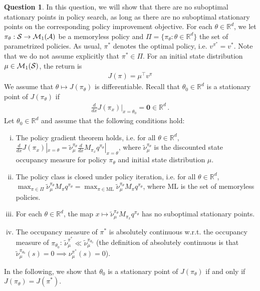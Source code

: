 \documentclass{article}
\newcommand{\R}{\mathbb{R}}
\DeclareMathOperator*{\1}{\mathbbm{1}}
\theoremstyle{definition}
\newtheorem{question}{Question}
\theoremstyle{remark}
\newcommand{\cS}{\mathcal{S}}
\newcommand{\cA}{\mathcal{A}}
\begin{document}
\begin{question} In this question, we will show that there are no suboptimal stationary points in policy search, as long as there are no suboptimal stationary points on the corresponding policy improvement objective. For each $\theta \in \R^d$, we let $\pi_\theta : \cS \rightarrow \cM_1(\cA)$ be a memoryless policy and $\Pi = \{\pi_\theta: \theta \in \R^d\}$ the set of parametrized policies. As usual, $\pi^*$ denotes the optimal policy, i.e. $v^{\pi^*} = v^*$. Note that we do not assume explicitly that $\pi^* \in \Pi$. For an initial state distribution $\mu \in \cM_1(\cS)$, the return is
\begin{align}
	J(\pi) = \mu^\top v^\pi
\end{align}
We assume that $\theta \mapsto J(\pi_\theta)$ is differentiable. Recall that $\theta_0 \in \R^d$ is a stationary point of $J(\pi_\theta)$ if
\begin{align}
\frac{d}{dx} J(\pi_x)|_{x = \theta_0}	= \mathbf{0} \in \R^d\,.
\end{align}
Let $\theta_0 \in \R^d$ and assume that the following conditions hold:
\begin{enumerate}[i)]
	\item The policy gradient theorem holds, i.e. for all $\theta \in \R^d$, $\frac{d}{dx} J(\pi_x)|_{x=\theta} = \tilde{\nu}^{\pi_\theta}_\mu \frac{d}{dx} M_{\pi_x} q^{\pi_\theta} |_{x=\theta}$, where  $\tilde{\nu}^{\pi_\theta}_\mu$ is the discounted state occupancy measure for policy $\pi_{\theta}$ and initial state distribution $\mu$.
	\item The policy class is closed under policy iteration, i.e. for all $\theta \in \R^d$, $\max_{\pi \in \Pi} \tilde\nu_\mu^{\pi_\theta} M_\pi q^{\pi_\theta} = \max_{\pi \in \text{ML}} \tilde\nu_\mu^{\pi_\theta} M_\pi q^{\pi_\theta}$, where $\text{ML}$ is the set of memoryless policies.
	\item For each $\theta \in \R^d$, the map $x \mapsto \tilde \nu_\mu^{\pi_\theta} M_{\pi_x} q^{\pi_\theta}$ has no suboptimal stationary points.
	\item The occupancy measure of $\pi^*$ is absolutely continuous w.r.t. the occupancy measure of $\pi_{\theta_0}$: $\tilde \nu_\mu^{\pi^*} \ll \tilde \nu_\mu^{\pi_{\theta_0}}$ (the definition of absolutely continuous is that $\tilde \nu_\mu^{\pi_{\theta_0}}(s) = 0 \implies \nu_\mu^{\pi^*}(s) = 0$).
\end{enumerate}
In the following, we show that $\theta_0$ is a stationary point of $J(\pi_\theta)$ if and only if  $J(\pi_\theta) = J(\pi^*)$.



\end{question}
\end{document}
